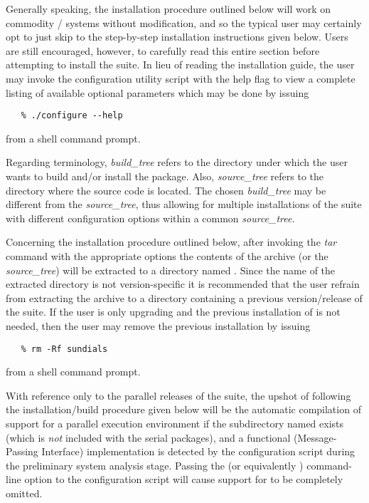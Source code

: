 Generally speaking, the installation procedure outlined below will work on commodity 
{\linux}/{\unix} systems without modification, and so 
the typical user may certainly opt to just skip to the step-by-step installation 
instructions given below.  Users are still encouraged, however, to carefully read this
entire section before attempting to install the {\sundials} suite.  
In lieu of reading the installation guide, the user may invoke the 
configuration utility script with the help flag to view a complete listing of 
available optional parameters which may be done by issuing 
\begin{verbatim}
   % ./configure --help 
\end{verbatim}
from a shell command prompt.

Regarding terminology, \textit{build\_tree} refers to the directory under which the 
user wants to build and/or install the {\sundials} package.  
Also, \textit{source\_tree} refers to the directory where the {\sundials} 
source code is located.  The chosen \textit{build\_tree} may be different from the \textit{source\_tree}, 
thus allowing for multiple installations of the {\sundials} suite with different 
configuration options within a common \textit{source\_tree}.

Concerning the installation procedure outlined below, after invoking the \textit{tar} 
command with the appropriate options the contents of the {\sundials} archive 
(or the \textit{source\_tree}) will be extracted to a directory named .  
Since the name of the extracted directory is not version-specific it is recommended that the 
user refrain from extracting the archive to a directory containing a previous version/release 
of the {\sundials} suite.  If the user is only upgrading and the previous 
installation of {\sundials} is not needed, then the user may remove the 
previous installation by issuing 
\begin{verbatim}
   % rm -Rf sundials
\end{verbatim}
from a shell command prompt.

With reference only to the parallel releases of the {\sundials} suite, the 
upshot of following the installation/build procedure given below will be the automatic 
compilation of support for a parallel execution environment if the subdirectory named 
 exists (which is \textit{not} included 
with the serial {\sundials} packages), and a functional {\mpi} (Message-Passing Interface) 
implementation is detected by the configuration script during the preliminary system analysis stage.  
Passing the  (or equivalently ) command-line 
option to the configuration script will cause support for {\mpi} to be completely omitted.

